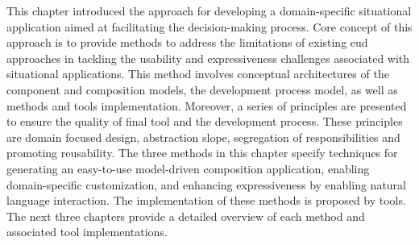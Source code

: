 This chapter introduced the approach for developing a domain-specific situational application aimed at facilitating the decision-making process. Core concept of this approach is to provide methods to address the limitations of existing \gls{eud} approaches in tackling the usability and expressiveness challenges associated with situational applications. This method involves conceptual architectures of the component and composition models, the development process model, as well as methods and tools implementation. Moreover, a series of principles are presented to ensure the quality of final tool and the development process. These principles are domain focused design, abstraction slope, segregation of responsibilities and promoting reusability. The three methods in this chapter specify techniques for generating an easy-to-use model-driven composition application, enabling domain-specific customization, and enhancing expressiveness by enabling  natural language interaction. The implementation of these methods is proposed by tools. The next three chapters provide a detailed overview of each method and associated tool implementations.  